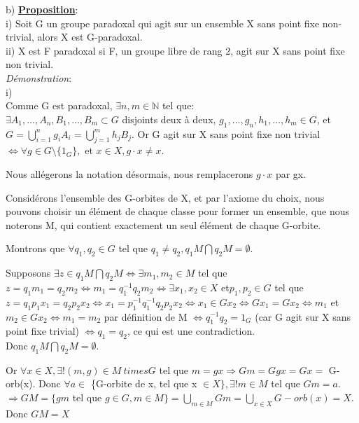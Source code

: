 \documentclass{article}
\begin{document}
\pagebreak

b) \underline{\textbf{Proposition}}: \\

i) Soit G un groupe paradoxal qui agit sur un ensemble X sans point fixe non-trivial, alors X est G-paradoxal.\\
ii) X est F paradoxal si F, un groupe libre de rang 2, agit sur X sans point fixe non trivial.\\

\textit{Démonstration}:\\

i) \\
Comme G est paradoxal, $\exists n,m \in \mathbb{N}$ tel que: \\
$\exists A_1, \dots, A_n, B_1, \dots, B_m \subset G$ disjoints deux à deux, $g_1, \dots, g_n, h_1, \dots, h_m \in G$, et $G = \bigcup_{i=1}^{n}g_iA_i = \bigcup_{j=1}^mh_jB_j$.
Or G agit sur X sans point fixe non trivial $\Leftrightarrow \forall g \in G \setminus \{1_G\},$ et $x \in X, g \cdot x \neq x$.

Nous allégerons la notation désormais, nous remplacerons $g \cdot x$ par gx.

Considérons l'ensemble des G-orbites de X, et par l'axiome du choix, nous pouvons choisir un élément de chaque classe pour former un ensemble, que nous noterons M, qui contient exactement un seul élément de chaque G-orbite.

Montrons que $\forall q_1, q_2 \in G $ tel que $q_1 \neq q_2, q_1M \bigcap q_2M = \emptyset$.

Supposons $\exists z \in q_1M \bigcap q_2M \Leftrightarrow \exists m_1, m_2 \in M $ tel que $z = q_1m_1 = q_2m_2 \Leftrightarrow m_1 = q_1^{-1}q_2m_2 \Leftrightarrow \exists x_1, x_2 \in X$ et$ p_1, p_2 \in G$ tel que $z = q_1p_1x_1 = q_2p_2x_2 \Leftrightarrow x_1 = p^{-1}_1q^{-1}_1q_2p_2x_2 \Leftrightarrow x_1 \in Gx_2 \Leftrightarrow Gx_1 = Gx_2\Leftrightarrow m_1$ et $m_2\in Gx_2 \Leftrightarrow m_1 = m_2$ par définition de M $\Leftrightarrow q_1^{-1}q_2 = 1_G$ (car G agit sur X sans point fixe trivial) $\Leftrightarrow q_1 = q_2$, ce qui est une contradiction.\\
Donc $q_1M \bigcap q_2M = \emptyset$.

Or $\forall x \in X, \exists! (m,g) \in M\ times G$ tel que $m = gx \Rightarrow Gm = Ggx = Gx =$ G-orb(x). Donc $\forall a \in$ \{G-orbite de x, tel que x $\in X\}, \exists! m \in M$ tel que $Gm=a$.
$\Rightarrow GM = \{gm$ tel que $g \in G, m \in M \} = \bigcup_{m \in M} Gm = \bigcup_{x \in X} G-orb(x) = X.$
Donc $GM = X$
\end{document}
